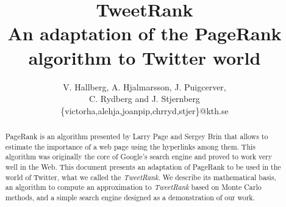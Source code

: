 \documentclass[11pt,a4paper]{article}
\author{V. Hallberg, A. Hjalmarsson, J. Puigcerver, \\C. Rydberg and J. Stjernberg\\
\footnotesize{\{victorha,alehja,joanpip,chrryd,stjer\}@kth.se}}
\title{\Huge TweetRank \\ \LARGE An adaptation of the PageRank algorithm to Twitter world}
\begin{document}
\maketitle
 \vspace{30px}
\begin{abstract}
\noindent
PageRank is an algorithm presented by Larry Page and Sergey Brin that allows to estimate the importance of a web page using the hyperlinks among them. This algorithm was originally the core of Google's search engine and proved to work very well in the Web. This document presents an adaptation of PageRank to be used in the world of Twitter, what we called the \emph{TweetRank}. We describe its mathematical basis, an algorithm to compute an approximation to \emph{TweetRank} based on Monte Carlo methods, and a simple search engine designed as a demonstration of our work.
\end{abstract}

\newpage

\tableofcontents  

\newpage








\newpage



\end{document}
